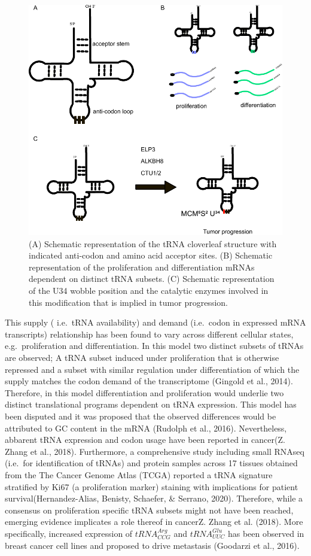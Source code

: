 \documentclass[
  12pt,
  openany]{book}
\begin{document}
\begin{figure}
  \includegraphics{./figures/tRNA.pdf}
  \caption{ (A) Schematic representation of the tRNA cloverleaf structure with indicated anti-codon and amino acid acceptor sites.  (B) Schematic representation of the proliferation and differentiation mRNAs dependent on distinct tRNA subsets. (C) Schematic representation of the U34 wobble position and the catalytic enzymes involved in this modification that is implied in tumor progression.
 \label{fig:tRNA}}
\end{figure}

This supply ( i.e.~tRNA availability) and demand (i.e.~codon in expressed mRNA transcripts) relationship has been found to vary across different cellular states, e.g.~proliferation and differentiation. In this model two distinct subsets of tRNAs are observed; A tRNA subset induced under proliferation that is otherwise repressed and a subset with similar regulation under differentiation of which the supply matches the codon demand of the transcriptome (Gingold et al., 2014). Therefore, in this model differentiation and proliferation would underlie two distinct translational programs dependent on tRNA expression. This model has been disputed and it was proposed that the observed differences would be attributed to GC content in the mRNA (Rudolph et al., 2016). Nevertheless, abbarent tRNA expression and codon usage have been reported in cancer(Z. Zhang et al., 2018). Furthermore, a comprehensive study including small RNAseq (i.e.~for identification of tRNAs) and protein samples across 17 tissues obtained from the The Cancer Genome Atlas (TCGA) reported a tRNA signature stratified by Ki67 (a proliferation marker) staining with implications for patient survival(Hernandez-Alias, Benisty, Schaefer, \& Serrano, 2020). Therefore, while a consensus on proliferation specific tRNA subsets might not have been reached, emerging evidence implicates a role thereof in cancerZ. Zhang et al. (2018). More specifically, increased expression of \(tRNA_{CCG}^{Arg}\) and \(tRNA_{UUC}^{Glu}\) has been observed in breast cancer cell lines and proposed to drive metastasis (Goodarzi et al., 2016).
\end{document}
